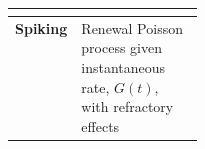 {\begin{tabularx}{\linewidth}{|p{0.22\linewidth}|X|}
{%
}  \\\hline
 \textbf{Spiking} & Renewal Poisson process given instantaneous rate, $G(t)$,  with refractory effects  \citep{ZilanyBruce:2007,Jackson:2003} \\\hline
\end{tabularx}
\vspace{2ex} 


}
